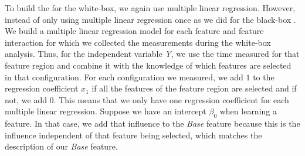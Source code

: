 To build the {\perfInfluenceModel} for the white-box, we again use multiple linear regression.
However, instead of only using multiple linear regression once as we did for the black-box {\perfInfluenceModel}.
We build a multiple linear regression model for each feature and feature interaction for which we collected the measurements during 
the white-box analysis.
Thus, for the independent variable \emph{Y},
we use the time measured for that feature region and combine it with the knowledge of which features are selected in that configuration.
For each configuration we measured, we add $1$ to the regression coefficient $x_1$ if all the features of the feature region are selected and if not,
we add $0$. This means that we only have one regression coefficient for each multiple linear regression.
Suppose we have an intercept $\beta_0$ when learning a feature. In that case, we add that influence to the \emph{Base} feature because this is the influence independent of that feature being selected, 
which matches the description of our \emph{Base} feature.

